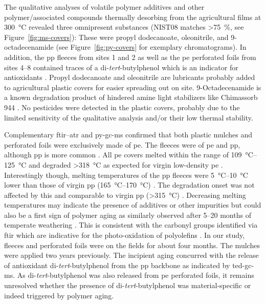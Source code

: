 The qualitative analyses of volatile polymer additives and other polymer\-/associated compounds thermally desorbing from the agricultural films at \SI{300}{\degreeCelsius} revealed three omnipresent substances (NIST08 matches \SI{>75}{\percent}, see Figure~\ref{fig:ms-covers}): These were propyl dodecanoate, oleonitrile, and 9-octadecenamide (see Figure~\ref{fig:py-covers} for exemplary chromatograms). In addition, the \ac{pp} fleeces from sites 1 and 2 as well as the \ac{pe} perforated foils from sites 4--8 contained traces of a di-\textit{tert}-butylphenol which is an indicator for antioxidants \citep{HahladakisOverview2018}. Propyl dodecanoate and oleonitrile are lubricants probably added to agricultural plastic covers for easier spreading out on site. 9-Octadecenamide is a known degradation product of hindered amine light stabilizers like Chimassorb 944 \citep{HaiderLoss2001}. No pesticides were detected in the plastic covers, probably due to the limited sensitivity of the qualitative analysis and/or their low thermal stability.

Complementary \ac{ftir}--\ac{atr} and \ac{py-gc-ms} confirmed that both plastic mulches and perforated foils were exclusively made of \ac{pe}. The fleeces were of \ac{pe} and \ac{pp}, although \ac{pp} is more common \citep{HamouzInfluence2011}. All \ac{pe} covers melted within the range of \SIrange{109}{125}{\degreeCelsius} and degraded \SI{>318}{\degreeCelsius} as expected for virgin low-density \ac{pe} \citep{BeylerThermal2002}. Interestingly though, melting temperatures of the \ac{pp} fleeces were \SIrange[range-phrase={ to }]{5}{10}{\degreeCelsius} lower than those of virgin \ac{pp} (\SIrange{165}{170}{\degreeCelsius}) \citep{BeylerThermal2002,TochacekPolymer2019}. The degradation onset was not affected by this and comparable to virgin \ac{pp} (\SI{>315}{\degreeCelsius}) \citep{BeylerThermal2002}. Decreasing melting temperatures may indicate the presence of additives or other impurities but could also be a first sign of polymer aging as similarly observed after \numrange{5}{20} months of temperate weathering \citep{TochacekPolymer2019}. This is consistent with the carbonyl groups identified via \ac{ftir} which are indicative for the photo-oxidation of polyolefins \citep{GrauseChanges2020}. In our study, fleeces and perforated foils were on the fields for about four months. The mulches were applied two years previously. The incipient aging concurred with the release of antioxidant di-\textit{tert}-butylphenol from the \ac{pp} backbone as indicated by \ac{ted-gc-ms}. As di-\textit{tert}-butylphenol was also released from \ac{pe} perforated foils, it remains unresolved whether the presence of di-\textit{tert}-butylphenol was material-specific or indeed triggered by polymer aging.

